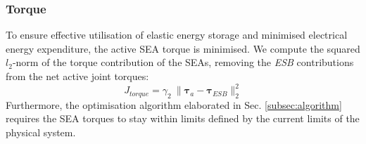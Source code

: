 \documentclass[letterpaper, 10 pt, conference]{ieeeconf}  %
\begin{document}

\subsubsection{Torque}
To ensure effective utilisation of elastic energy storage and minimised electrical energy expenditure, the active SEA torque is minimised. We compute the squared $l_2$-norm of the torque contribution of the SEAs, removing the \textit{ESB} contributions from the net active joint torques:
\begin{equation}
	J_{torque}= \gamma_2 \: \| \boldsymbol{\tau}_a - \boldsymbol{\tau}_{ESB} \|_2^2
\end{equation}
Furthermore, the optimisation algorithm elaborated in Sec. \ref{subsec:algorithm} requires the SEA torques to stay within limits defined by the current limits of the physical system.
\end{document}
